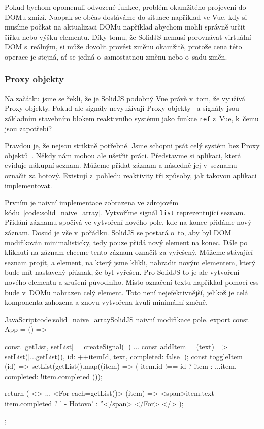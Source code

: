 \documentclass[
  master,
  program=ainf,
  printversion,
  tables=false,
  sourcecodes,
  glossaries,
  index
]{kidiplom}
\begin{document}
Pokud bychom opomenuli odvozené funkce, problém okamžitého projevení do DOMu zmizí. Naopak se občas
dostáváme do situace například ve Vue, kdy si musíme počkat na aktualizaci DOMu například abychom mohli
správně určit šířku nebo výšku elementu. Díky tomu, že SolidJS nemusí porovnávat virtuální DOM s~reálným,
si může dovolit provést změnu okamžitě, protože cena této operace je stejná, ať se jedná o~samostatnou změnu
nebo o~sadu změn. 
    
\subsubsection{Proxy objekty}
Na začátku jsme se řekli, že je SolidJS podobný Vue právě v~tom, že využívá Proxy objekty. Pokud ale
signály nevyužívají Proxy objekty~\cite{proxy} a signály jsou základním stavebním blokem reaktivního systému jako
funkce {\tt ref} z~Vue, k~čemu jsou zapotřebí?

Pravdou je, že nejsou striktně potřebné. Jsme schopni psát celý systém bez Proxy objektů~\cite{proxy}.
Někdy nám mohou ale ušetřit práci. Představme si aplikaci, která eviduje nákupní seznam. Můžeme přidat
záznam a následně jej v~seznamu označit za hotový. Existují z~pohledu reaktivity tři způsoby, jak takovou 
aplikaci implementovat.

Prvním je naivní implementace zobrazena ve zdrojovém kódu~\ref{code:solid_naive_array}. Vytvoříme signál {\tt list}
reprezentující seznam. Přidání záznamu spočívá ve 
vytvoření nového pole, kde na konec přidáme nový záznam. Dosud je vše v~pořádku. SolidJS se postará o~to,
aby byl DOM modifikován minimalisticky, tedy pouze přidá nový element na konec. Dále po kliknutí na záznam
chceme tento záznam označit za vyřešený. Můžeme stávající seznam projít, a element, na který jsme klikli,
nahradit novým elementem, který bude mít nastavený příznak, že byl vyřešen. Pro SolidJS to je ale vytvoření
nového elementu a zrušení původního. Místo označení textu například pomocí css bude v~DOMu nahrazen celý
element. Toto není nejefektivnější, jelikož je celá komponenta zahozena a znovu vytvořena kvůli minimální
změně.

  \begin{kicode}{JavaScript}{code:solid_naive_array}{SolidJS naivní modifikace pole.}
    export const App = () => {
      const [getList, setList] = createSignal([])
      ...
      const addItem = (text) => {
        setList([...getList(), { id: ++itemId, text, completed: false }]);
      }
      const toggleItem = (id) => {
        setList(getList().map((item) => (
          item.id !== id ? item : { ...item, completed: !item.completed }
        )));
      }

      return (
        <>
          ...
          <For each={getList()}>
            {(item) => {<span>{item.text} {item.completed ? ' - Hotovo' : ''</span>} }}
          </For>
        </>
      );
    };
\end{kicode}
\end{document}
